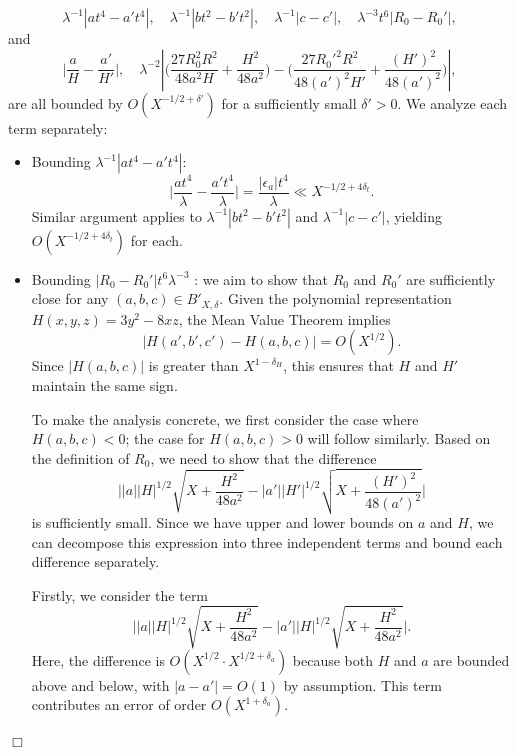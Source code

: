 \documentclass[10pt,a4paper]{amsart}
\newenvironment{proof}{\noindent {\bf Proof:}}{$\Box$ \vspace{2 ex}}
\begin{document}
\begin{proof}
\begin{equation*}
 \lambda^{-1}|a t^4 - a' t^4|, \quad \lambda^{-1}| b t^2 -b' t^2|, \quad \lambda^{-1}|c-c'|, \quad  \lambda^{-3}t^6|R_0-R_0' |,
\end{equation*}
and 
\begin{equation*}
\Big| \frac{ a }{H } - \frac{a' }{H' } \Big|, \quad 
\lambda^{-2}\left|\Big(\frac{27 R_0^2R^2}{48 a^2 H} + \frac{H^2}{48 a^2}\Big)-\Big(\frac{27 R_0'^2R^2}{48 (a')^2 H'} + \frac{(H')^2}{48 (a')^2}\Big) \right|,
\end{equation*}
are all bounded by $O(X^{-1/2 + \delta'})$ for a sufficiently small $\delta' > 0$. We analyze each term separately:

\begin{itemize}
    \item Bounding $\lambda^{-1}|a t^4 - a' t^4|$:
    \begin{equation*}
    \Big| \frac{a t^4}{\lambda} - \frac{a' t^4}{\lambda} \Big| = \frac{|\epsilon_a| t^4}{\lambda} \ll X^{-1/2 + 4\delta_t}.
    \end{equation*}
Similar argument applies to $\lambda^{-1}| b t^2 -b' t^2|$ and $\lambda^{-1}|c-c'|$, yielding $O(X^{-1/2 + 4\delta_t})$ for each.

\item Bounding $|R_0-R_0'|t^6\lambda^{-3}$ :
we aim to show that $R_0$ and $R_0'$ are sufficiently close for any $(a, b, c) \in B'_{X, \delta}$. Given the polynomial representation \( H(x,y,z) = 3y^2 - 8xz \), the Mean Value Theorem implies
\begin{equation*}
|H(a', b', c') - H(a, b, c)| = O(X^{1/2}).
\end{equation*}
Since $|H(a, b, c)|$ is greater than $X^{1 - \delta_H}$, this ensures that $H$ and $H'$ maintain the same sign.

To make the analysis concrete, we first consider the case where \( H(a, b, c) < 0 \); the case for \( H(a, b, c) > 0 \) will follow similarly. Based on the definition of \( R_0 \), we need to show that the difference
\begin{equation*}
\Big| |a| |H|^{1/2} \sqrt{X + \frac{H^2}{48a^2}} - |a'| |H'|^{1/2} \sqrt{X + \frac{(H')^2}{48(a')^2}} \Big|
\end{equation*}
is sufficiently small. Since we have upper and lower bounds on $a$ and $H$, we can decompose this expression into three independent terms and bound each difference separately.

Firstly, we consider the term
\begin{equation*}
\Big| |a| |H|^{1/2} \sqrt{X + \frac{H^2}{48a^2}} - |a'| |H|^{1/2} \sqrt{X + \frac{H^2}{48a^2}} \Big|.
\end{equation*}
Here, the difference is $O(X^{1/2} \cdot X^{1/2 + \delta_a})$ because both $H$ and $a$ are bounded above and below, with $|a - a'| = O(1)$ by assumption. This term contributes an error of order $O(X^{1 + \delta_a})$.


\end{itemize}
\end{proof}
\end{document}
